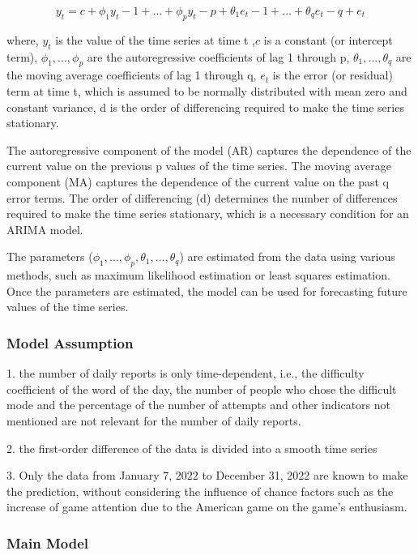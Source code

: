 \documentclass{mcmthesis}
\begin{document}
\[y_t = c + \phi_1y_t-1 + ... + \phi_py_t-p + \theta_1e_t-1 + ... + \theta_qe_t-q + e_t\]

where, $y_t$ is the value of the time series at time t
,$c$ is a constant (or intercept term), $\phi_1,...,\phi_p $ are the autoregressive coefficients of lag 1 through p,
$\theta_1,...,\theta_q$ are the moving average coefficients of lag 1 through q,
$e_t$ is the error (or residual) term at time t, which is assumed to be normally distributed with mean zero and constant variance,
d is the order of differencing required to make the time series stationary.


The autoregressive component of the model (AR) captures the dependence of the current value on the previous p values of the time series. The moving average component (MA) captures the dependence of the current value on the past q error terms. The order of differencing (d) determines the number of differences required to make the time series stationary, which is a necessary condition for an ARIMA model.

The parameters ($\phi_1, ..., \phi_p, \theta_1, ..., \theta_q$) are estimated from the data using various methods, such as maximum likelihood estimation or least squares estimation. Once the parameters are estimated, the model can be used for forecasting future values of the time series.

\subsubsection{Model Assumption}

\hspace*{0.6cm} 1. the number of daily reports is only time-dependent, i.e., the difficulty coefficient of the word of the day, the number of people who chose the difficult mode and the percentage of the number of attempts and other indicators not mentioned are not relevant for the number of daily reports.

2. the first-order difference of the data is divided into a smooth time series

3. Only the data from January 7, 2022 to December 31, 2022 are known to make the prediction, without considering the influence of chance factors such as the increase of game attention due to the American game on the game's enthusiasm.

\subsubsection{Main Model}
\end{document}
